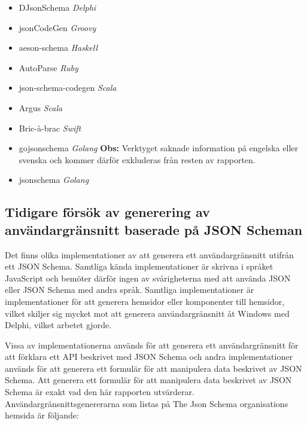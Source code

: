 \begin{itemize}
	\item DJsonSchema \textit{Delphi} \cite{Schlothauer&WauerGmbH}
	\item jsonCodeGen \textit{Groovy} \cite{Schlothauer&WauerGmbHa}
	\item aeson-schema \textit{Haskell} \cite{Kowalczyk}
	\item AutoParse \textit{Ruby} \cite{Googleb}
	\item json-schema-codegen \textit{Scala} \cite{Tundra}
	\item Argus \textit{Scala} \cite{Fenton}
	\item Bric-à-brac \textit{Swift} \cite{GlimpseI/OInc}
	\item gojsonschema \textit{Golang} \textbf{Obs:} Verktyget saknade information på engelska eller svenska och kommer därför exkluderas från resten av rapporten. \cite{Zhangtao}
	\item jsonschema \textit{Golang} \cite{Qriinc.}
\end{itemize}

\subsection{Tidigare försök av generering av användargränsnitt baserade på JSON Scheman}
\label{sec:teori:schema-användningsområden:ui-generering}
Det finns olika implementationer av att generera ett användargränsnitt utifrån ett JSON Schema. Samtliga kända implementationer är skrivna i språket JavaScript och bemöter därför ingen av svårigheterna med att använda JSON eller JSON Schema med andra språk. Samtliga implementationer är implementationer för att generera hemsidor eller komponenter till hemsidor, vilket skiljer sig mycket mot att generera användargränsnitt åt Windows med Delphi, vilket arbetet gjorde.

Vissa av implementationerna används för att generera ett användargränsnitt för att förklara ett API beskrivet med JSON Schema och andra implementationer används för att generera ett formulär för att manipulera data beskrivet av JSON Schema. Att generera ett formulär för att manipulera data beskrivet av JSON Schema är exakt vad den här rapporten utvärderar. Användargränsnittsgenererarna som listas på The Json Schema organisations hemsida är följande:

